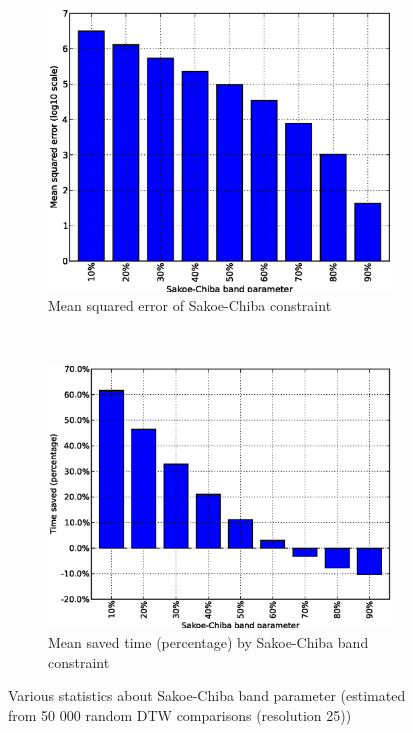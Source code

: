 \documentclass[10pt,a4paper]{article}
\begin{document}
\begin{figure}
\centering
\begin{subfigure}{0.45\textwidth}
   \includegraphics[width=\textwidth]{images/sakoe-chiba-mean-sq-error.eps}
   \caption{Mean squared error of Sakoe-Chiba constraint}
   \label{fig:sakoe-chiba-mean-sq-error}
\end{subfigure}
~
\begin{subfigure}{0.45\textwidth}
    \includegraphics[width=\textwidth]{images/sakoe-chiba-time-saved.eps}
    \caption{Mean saved time (percentage) by Sakoe-Chiba band constraint}
    \label{fig:sakoe-chiba-mean-sq-error}
\end{subfigure}
\label{fig:sakoe_chiba_data}
\caption{Various statistics about Sakoe-Chiba band parameter (estimated from 50 000 random DTW comparisons (resolution 25))}
\end{figure}
\end{document}
